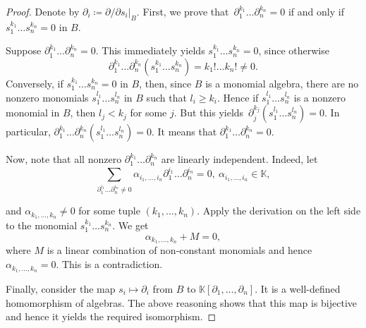 \documentclass[10pt,a4paper]{amsart}
\def\BK{{\mathbb K}}
\begin{document}
    \begin{proof}
        Denote by $\partial_i\coloneq\partial/\partial s_i|_B$. First, we prove that~$\partial_1^{k_1}\dotsc\partial_n^{k_n}= 0$ if and only if~$s_1^{k_1}\dotsc s_n^{k_n} =0$  in $B$. 

        Suppose $\partial_1^{k_1}\dotsc\partial_n^{k_n} = 0$. This immediately yields $s_1^{k_1}\dotsc s_n^{k_n} = 0$, since otherwise\begin{equation*}
            \partial_1^{k_1}\dotsc\partial_n^{k_n}(s_1^{k_1}\dotsc s_n^{k_n})= k_1!\dotsc k_n!\neq0.
        \end{equation*}
        Conversely, if $s_1^{k_1}\dotsc s_n^{k_n} = 0$ in $B$, then, since $B$ is a monomial algebra, there are no nonzero monomials $s_1^{l_1}\dotsc s_n^{l_n}$ in $B$ such that $l_i\geq k_i$. Hence if $s_1^{l_1}\dotsc s_n^{l_n}$ is a nonzero monomial in $B$, then $l_j<k_j$ for some $j$. But this yields~$\partial_j^{k_j}(s_1^{l_1}\dotsc s_n^{l_n})=0$. In particular, $\partial_1^{k_1}\dotsc\partial_n^{k_n}(s_1^{l_1}\dotsc s_n^{l_n})=0$. It means that $\partial_1^{k_1}\dotsc\partial_n^{k_n} = 0$.

        Now, note that all nonzero $\partial_1^{k_1}\dotsc\partial_n^{k_n}$ are linearly independent. Indeed, let \begin{equation*}          \sum_{\partial_1^{i_1}\dotsc\partial_n^{i_n}\neq0}\alpha_{i_1,\dotsc,i_n}\partial_1^{i_1}\dotsc\partial_n^{i_n}=0, \ \alpha_{i_1,\dotsc,i_n}\in\BK,
        \end{equation*}

        and $\alpha_{k_1,\dotsc,k_n}\neq0$ for some tuple $(k_1,\dotsc,k_n)$. Apply the derivation on the left side to the monomial $s_1^{k_1}\dotsc s_n^{k_n}$. We get \begin{equation*}
            \alpha_{k_1,\dotsc,k_n}+M = 0,
        \end{equation*} where $M$ is a linear combination of non-constant monomials and hence $\alpha_{k_1,\dotsc,k_n}=0$. This is a contradiction.

        Finally, consider the map $s_i\mapsto\partial_i$ from $B$ to $\BK[\partial_1,\dotsc,\partial_n]$. It is a well-defined homomorphism of algebras. The above reasoning shows that this map is bijective and hence it yields the required isomorphism.
    \end{proof}
\end{document}
